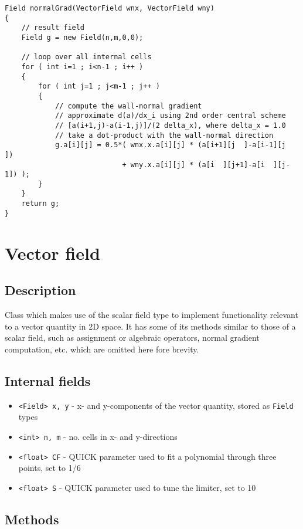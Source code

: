 \documentclass[notitlepage]{article}
\begin{document}
\begin{lstlisting}[style=myCpp]
Field normalGrad(VectorField wnx, VectorField wny)
{
	// result field
	Field g = new Field(n,m,0,0);
	
	// loop over all internal cells
	for ( int i=1 ; i<n-1 ; i++ )
	{
		for ( int j=1 ; j<m-1 ; j++ )
		{
			// compute the wall-normal gradient
			// approximate d(a)/dx_i using 2nd order central scheme
			// [a(i+1,j)-a(i-1,j)]/(2 delta_x), where delta_x = 1.0
			// take a dot-product with the wall-normal direction
			g.a[i][j] = 0.5*( wnx.x.a[i][j] * (a[i+1][j  ]-a[i-1][j  ])
							+ wny.x.a[i][j] * (a[i  ][j+1]-a[i  ][j-1]) );
		}
	}
	return g;
}
\end{lstlisting}

\section{Vector field}

\subsection{Description}

Class which makes use of the scalar field type to implement functionality
relevant to a vector quantity in 2D space.
It has some of its methods similar to those of a scalar field, such as assignment
or algebraic operators, normal gradient computation, etc. which are omitted here
fore brevity.

\subsection{Internal fields}

\begin{itemize}
\item \texttt{<Field> x, y} - x- and y-components of the vector quantity, stored
	as \texttt{Field} types
\item \texttt{<int> n, m} - no. cells in x- and y-directions
\item \texttt{<float> CF} - QUICK parameter used to fit a polynomial through three points, set to 1/6 
\item \texttt{<float> S} - QUICK parameter used to tune the limiter, set to 10
\end{itemize}

\subsection{Methods}
\end{document}
